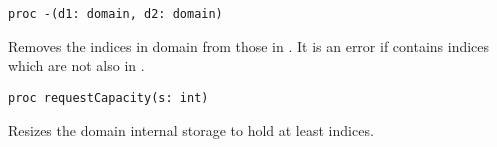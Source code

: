 \begin{protohead}
\begin{verbatim}
proc -(d1: domain, d2: domain)
\end{verbatim}
\end{protohead}
\begin{protobody}
Removes the indices in domain  from those in .  It is an error
if  contains indices which are not also in .
\end{protobody}

\begin{protohead}
\begin{verbatim}
proc requestCapacity(s: int)
\end{verbatim}
\end{protohead}
\begin{protobody}
Resizes the domain internal storage to hold at least  indices.
\end{protobody}
